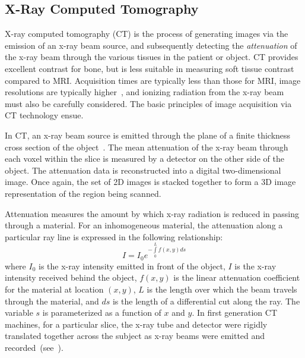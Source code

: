 \subsection{X-Ray Computed Tomography}
\label{X-Ray Computed Tomography}

X-ray computed tomography (CT) is the process of generating images via the emission of an x-ray beam source, and subsequently detecting the \textit{attenuation} of the x-ray beam through the various tissues in the patient or object. CT provides excellent contrast for bone, but is less suitable in measuring soft tissue contrast compared to MRI. Acquisition times are typically less than those for MRI, image resolutions are typically higher~\cite{pomeranz_2007}, and ionizing radiation from the x-ray beam must also be carefully considered. The basic principles of image acquisition via CT technology ensue.

In CT, an x-ray beam source is emitted through the plane of a finite thickness cross section of the object~\cite{mahesh_2002}. The mean attenuation of the x-ray beam through each voxel within the slice is measured by a detector on the other side of the object. The attenuation data is reconstructed into a digital two-dimensional image. Once again, the set of 2D images is stacked together to form a 3D image representation of the region being scanned.

Attenuation measures the amount by which x-ray radiation is reduced in passing through a material. For an inhomogeneous material, the attenuation along a particular ray line is expressed in the following relationship:
\begin{equation}
I= I_0e^{-\int\limits_{0}^{L}f(x,y) ds}
\label{eqn:init}
\end{equation}
where $I_0$ is the x-ray intensity emitted in front of the object, $I$ is the x-ray intensity received behind the object, $f(x,y)$ is the linear attenuation coefficient for the material at location $(x,y)$, $L$ is the length over which the beam travels through the material, and $ds$ is the length of a differential cut along the ray. The variable $s$ is parameterized as a function of $x$ and $y$. In first generation CT machines, for a particular slice, the x-ray tube and detector were rigidly translated together across the subject as x-ray beams were emitted and recorded~(see~).

